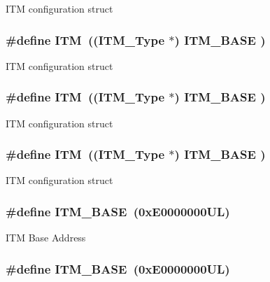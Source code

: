 I\-T\-M configuration struct \hypertarget{group___c_m_s_i_s__core__base_gabae7cdf882def602cb787bb039ff6a43}{
\subsubsection[{I\-T\-M}]{\setlength{\rightskip}{0pt plus 5cm}\#define I\-T\-M~(({\bf I\-T\-M\-\_\-\-Type}       $\ast$)     {\bf I\-T\-M\-\_\-\-B\-A\-S\-E}      )}}\label{group___c_m_s_i_s__core__base_gabae7cdf882def602cb787bb039ff6a43}
I\-T\-M configuration struct \hypertarget{group___c_m_s_i_s__core__base_gabae7cdf882def602cb787bb039ff6a43}{
\subsubsection[{I\-T\-M}]{\setlength{\rightskip}{0pt plus 5cm}\#define I\-T\-M~(({\bf I\-T\-M\-\_\-\-Type}       $\ast$)     {\bf I\-T\-M\-\_\-\-B\-A\-S\-E}      )}}\label{group___c_m_s_i_s__core__base_gabae7cdf882def602cb787bb039ff6a43}
I\-T\-M configuration struct \hypertarget{group___c_m_s_i_s__core__base_gabae7cdf882def602cb787bb039ff6a43}{
\subsubsection[{I\-T\-M}]{\setlength{\rightskip}{0pt plus 5cm}\#define I\-T\-M~(({\bf I\-T\-M\-\_\-\-Type}       $\ast$)     {\bf I\-T\-M\-\_\-\-B\-A\-S\-E}      )}}\label{group___c_m_s_i_s__core__base_gabae7cdf882def602cb787bb039ff6a43}
I\-T\-M configuration struct \hypertarget{group___c_m_s_i_s__core__base_gadd76251e412a195ec0a8f47227a8359e}{
\subsubsection[{I\-T\-M\-\_\-\-B\-A\-S\-E}]{\setlength{\rightskip}{0pt plus 5cm}\#define I\-T\-M\-\_\-\-B\-A\-S\-E~(0x\-E0000000\-U\-L)}}\label{group___c_m_s_i_s__core__base_gadd76251e412a195ec0a8f47227a8359e}
I\-T\-M Base Address \hypertarget{group___c_m_s_i_s__core__base_gadd76251e412a195ec0a8f47227a8359e}{
\subsubsection[{I\-T\-M\-\_\-\-B\-A\-S\-E}]{\setlength{\rightskip}{0pt plus 5cm}\#define I\-T\-M\-\_\-\-B\-A\-S\-E~(0x\-E0000000\-U\-L)}}\label{group___c_m_s_i_s__core__base_gadd76251e412a195ec0a8f47227a8359e}
